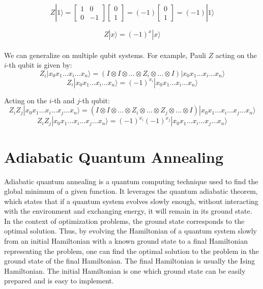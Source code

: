 \documentclass[12pt,a4paper]{report}
\begin{document}
\[
Z|1\rangle = 
\begin{bmatrix}
1 & 0 \\
0 & -1 
\end{bmatrix}
\begin{bmatrix}
0 \\
1 
\end{bmatrix} 
= (-1) 
\begin{bmatrix}
0 \\
1 
\end{bmatrix} 
= (-1) |1\rangle
\]

\[
Z|x\rangle = (-1)^x |x\rangle
\]
\\

\noindent
We can generalize on multiple qubit systems. For example, Pauli \(Z\) acting on the \(i\)-th qubit is given by:
\[
Z_i |x_0 x_1 \ldots x_i \ldots x_n\rangle = (I \otimes I \otimes \ldots \otimes Z_i \otimes \ldots \otimes I) |x_0 x_1 \ldots x_i \ldots x_n\rangle
\]
\[
Z_i |x_0 x_1 \ldots x_i \ldots x_n\rangle = (-1)^{x_i} |x_0 x_1 \ldots x_i \ldots x_n\rangle
\]

\noindent
Acting on the \(i\)-th and \(j\)-th qubit:
\[
Z_i Z_j |x_0 x_1 \ldots x_i \ldots x_j \ldots x_n\rangle = (I \otimes I \otimes \ldots \otimes Z_i \otimes \ldots \otimes Z_j \otimes \ldots \otimes I) |x_0 x_1 \ldots x_i \ldots x_j \ldots x_n\rangle
\]
\[
Z_i Z_j |x_0 x_1 \ldots x_i \ldots x_j \ldots x_n\rangle = (-1)^{x_i} (-1)^{x_j} |x_0 x_1 \ldots x_i \ldots x_j \ldots x_n\rangle
\]

\section{Adiabatic Quantum Annealing}

Adiabatic quantum annealing \cite{AdiabaticQuantumComputingandQuantumAnnealing} is a quantum computing technique used to find the global minimum of a given function. It leverages the quantum adiabatic theorem, which states that if a quantum system evolves slowly enough, without interacting with the environment and exchanging energy, it will remain in its ground state. In the context of optimization problems, the ground state corresponds to the optimal solution. Thus, by evolving the Hamiltonian of a quantum system slowly from an initial Hamiltonian with a known ground state to a final Hamiltonian representing the problem, one can find the optimal solution to the problem in the ground state of the final Hamiltonian. The final Hamiltonian is usually the Ising Hamiltonian. The initial Hamiltonian is one which ground state can be easily prepared and is easy to implement.
\end{document}
